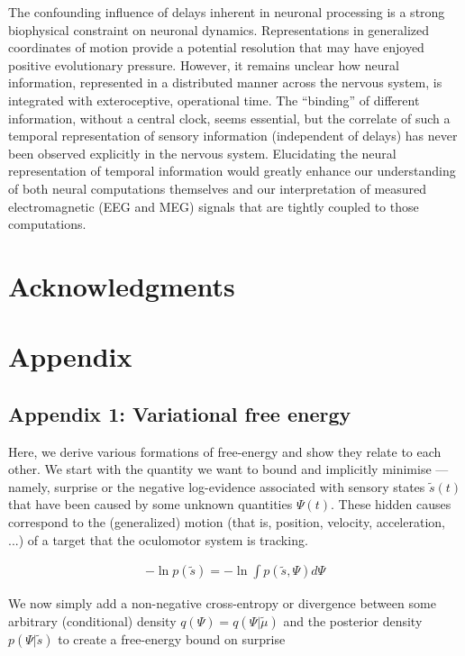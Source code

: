 \documentclass[a4paper]{article} %
\begin{document}
The confounding influence of delays inherent in neuronal processing is a
strong biophysical constraint on neuronal dynamics. Representations in
generalized coordinates of motion provide a potential resolution that
may have enjoyed positive evolutionary pressure. However, it remains
unclear how neural information, represented in a distributed manner
across the nervous system, is integrated with exteroceptive, operational
time. The ``binding'' of different information, without a central clock,
seems essential, but the correlate of such a temporal representation of
sensory information (independent of delays) has never been observed
explicitly in the nervous system. Elucidating the neural representation
of temporal information would greatly enhance our understanding of both
neural computations themselves and our interpretation of measured
electromagnetic (EEG and MEG) signals that are tightly coupled to those
computations.

\section*{Acknowledgments}
\Acknowledgments
\section{Appendix}
\subsection{Appendix 1: Variational free energy}


Here, we derive various formations of free-energy and show they relate to each other. We start with the quantity we want to bound and implicitly minimise --- namely, surprise or the negative log-evidence associated with sensory states $\tilde{s}(t)$ that have been caused by some unknown quantities $\Psi(t)$. These hidden causes correspond to the (generalized) motion (that is, position, velocity, acceleration, ...) of a target that the oculomotor system is tracking.

\begin{align}
- \ln p(\tilde{s}) = - \ln  \int p(\tilde{s} , \Psi) d \Psi \label{eq:app1-1}
\end{align}%

We now simply add a non-negative cross-entropy or divergence between some arbitrary (conditional) density $q(\Psi)=q(\Psi | \tilde{\mu})$ and the posterior density $p(\Psi | \tilde{s})$ to create a free-energy bound on surprise 
\end{document}
